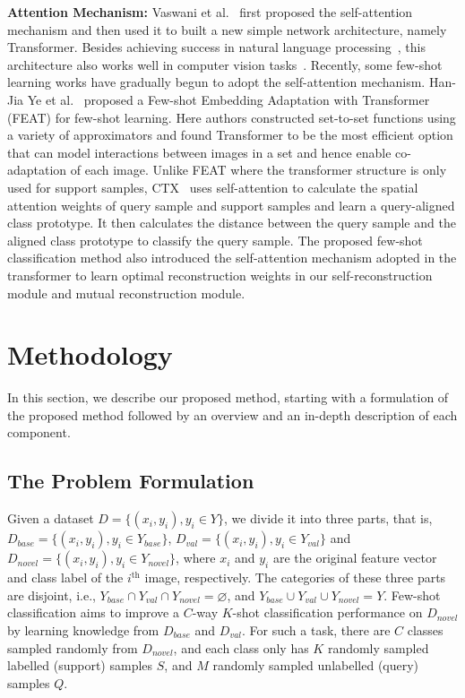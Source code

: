 \documentclass[letterpaper]{article} %
\begin{document}

\textbf{Attention Mechanism:}
Vaswani et al.~\cite{NIPS2017_3f5ee243} first proposed the self-attention mechanism and then used it to built a new simple network architecture, namely Transformer.
Besides achieving success in natural language processing~\cite{NIPS2017_3f5ee243, Devlin2019BERTPO, brown2020language}, this architecture also works well in computer vision tasks~\cite{dosovitskiy2021an, hassani2021escaping, Chen2021CrossViTCM}.
Recently, some few-shot learning works have gradually begun to adopt the self-attention mechanism. Han-Jia Ye et al.~\cite{Ye_2020_CVPR} proposed a Few-shot Embedding Adaptation with Transformer (FEAT) for few-shot learning. Here authors constructed set-to-set functions using a variety of approximators and found Transformer to be the most efficient option that {can model interactions between images in a set and hence enable co-adaptation of each image.}
{Unlike FEAT where the transformer structure is only used for support samples, CTX~\cite{NEURIPS2020_fa28c6cd} uses self-attention to calculate the spatial attention weights of query sample and support samples and learn a query-aligned class prototype. It then calculates the distance between the query sample and the aligned class prototype to classify the query sample.}
The proposed few-shot classification method also introduced the self-attention mechanism adopted in the transformer to learn optimal reconstruction weights in our self-reconstruction module and mutual reconstruction module.



\section{Methodology}
In this section, we describe our proposed method, starting with a formulation of the proposed method followed by an overview and an in-depth description of each component.





\subsection{The Problem Formulation}
Given a dataset $D = \{(x_i,y_i), y_i \in Y\}$, we divide it into three parts, that is, $D_{base} = \{(x_i,y_i), y_i \in Y_{base}\}$, $D_{val} = \{(x_i,y_i), y_i \in Y_{val}\}$ and $D_{novel} =\{ (x_i,y_i), y_i \in Y_{novel}\}$, where $x_i$ and  $y_i$ are the original feature vector and class label of the $i^\text{th}$ image, respectively.
The categories of these three parts are disjoint, i.e., $Y_{base} \cap Y_{val} \cap Y_{novel} = \varnothing$, and $Y_{base} \cup Y_{val} \cup Y_{novel} = Y$.
Few-shot classification aims to improve a $C$-way $K$-shot classification performance on $D_{novel}$ by learning knowledge from $D_{base}$ and $D_{val}$.
For such a task, there are $C$ classes sampled randomly from $D_{novel}$, and each class only has $K$ {randomly sampled} labelled (support) samples $S$, and $M$ {randomly sampled} unlabelled (query) samples $Q$.
\end{document}
